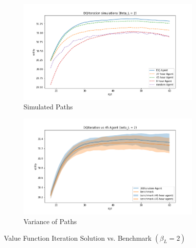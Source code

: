 \begin{figure}[ht]
\begin{subfigure}{.5\textwidth}
  \centering
  \includegraphics[width=1\linewidth]{figures/dqi_model1_beta_2_solution_benchmark_paths.png}
  \caption{Simulated Paths}
  \label{fig:dqi_solution_beta2_path}
\end{subfigure}%
\begin{subfigure}{.5\textwidth}
  \centering
  \includegraphics[width=1\linewidth]{figures/dqi_model1_beta_2_solution_benchmark_variance.png}
  \caption{Variance of Paths}
  \label{fig:dqi_solution_beta2_var}
\end{subfigure}
    \caption{Value Function Iteration Solution vs. Benchmark $(\beta_L = 2)$}
    \label{fig:dqi_solution_beta2}
\end{figure}

